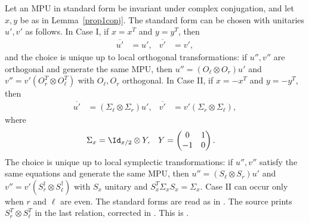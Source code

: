 \begin{lemma}
    \label{corconj}
    \leanok
    Let an MPU in standard form be invariant under complex conjugation, and let
    $x,y$ be as in Lemma~\ref{prop1conj}. The standard form can be chosen with
    unitaries $u',v'$ as follows. In Case I, if $x=x^T$ and $y=y^T$, then
    \begin{align}
        \overline{u'} & =u', & \overline{v'} & =v',
    \end{align}
    and the choice is unique up to local orthogonal transformations: if
    $u'',v''$ are orthogonal and generate the same MPU, then
    $u''=(O_\ell\otimes O_r)u'$ and $v''=v'(O_r^T\otimes O_\ell^T)$ with
    $O_\ell,O_r$ orthogonal. In Case II, if $x=-x^T$ and $y=-y^T$, then
    \begin{align}
        \overline{u'} & =(\Sigma_\ell\otimes\Sigma_r)u', &
        \overline{v'} & =v'(\Sigma_r\otimes\Sigma_\ell),
    \end{align}
    where
    \begin{align}
        \Sigma_x & =\Id_{x/2}\otimes Y,                    &
        Y        & =\begin{pmatrix}0&1\\-1&0\end{pmatrix}.
    \end{align}
    The choice is unique up to local symplectic transformations: if $u'',v''$
    satisfy the same equations and generate the same MPU, then
    $u''=(S_\ell\otimes S_r)u'$ and $v''=v'(S_r^\dagger\otimes S_\ell^\dagger)$
    with $S_x$ unitary and $S_x^T\Sigma_xS_x=\Sigma_x$. Case II can occur only
    when $r$ and $\ell$ are even. The standard forms are read as in
    \cite{gap:mpu_standard_form_canonical_convention}. The source prints
    $S_r^T\otimes S_\ell^T$ in the last relation, corrected in
    \cite{gap:mpu_conjugation_symplectic_uniqueness_transpose}.
    This is \cite[Proposition~V.2]{Cirac2017MPU}.
\end{lemma}

